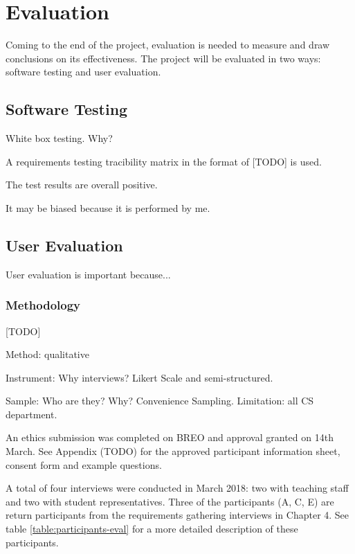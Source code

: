 \chapter{Evaluation}

Coming to the end of the project, evaluation is needed to measure and draw conclusions
on its effectiveness. The project will be evaluated in two ways:
software testing and user evaluation.

\section{Software Testing}

White box testing. Why?

A requirements testing tracibility matrix in the format of [TODO] is used.

The test results are overall positive.

It may be biased because it is performed by me.

\section{User Evaluation}

User evaluation is important because...

\subsection{Methodology}
[TODO]

Method: qualitative

Instrument: Why interviews? Likert Scale and semi-structured.

Sample: Who are they? Why? Convenience Sampling. Limitation: all CS department.

An ethics submission was completed on BREO and approval granted on 14th March.
See Appendix (TODO) for the approved participant information sheet, consent form and example questions.

A total of four interviews were conducted in March 2018:
two with teaching staff and two with student representatives.
Three of the participants (A, C, E) are return participants from the requirements gathering interviews in Chapter 4.
See table \ref{table:participants-eval} for a more detailed description of these participants.

